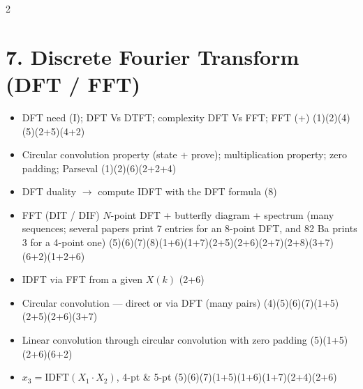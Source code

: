 \documentclass[10pt]{article}
\begin{document}
\begin{multicols}{2}
\section*{7. Discrete Fourier Transform (DFT / FFT)}
\begin{itemize}
  \item DFT need (I); DFT Vs DTFT; complexity DFT Vs FFT; FFT (+) \hfill (1)\allowbreak(2)\allowbreak(4)\allowbreak(5)\allowbreak(2+5)\allowbreak(4+2)
  \item Circular convolution property (state + prove); multiplication property; zero padding; Parseval \hfill (1)\allowbreak(2)\allowbreak(6)\allowbreak(2+2+4)
  \item DFT duality $\to$ compute IDFT with the DFT formula \hfill (8)
  \item FFT (DIT / DIF) $N$-point DFT + butterfly diagram + spectrum (many sequences; several papers print 7 entries for an 8-point DFT, and 82 Ba prints 3 for a 4-point one) \hfill (5)\allowbreak(6)\allowbreak(7)\allowbreak(8)\allowbreak(1+6)\allowbreak(1+7)\allowbreak(2+5)\allowbreak(2+6)\allowbreak(2+7)\allowbreak(2+8)\allowbreak(3+7)\allowbreak(6+2)\allowbreak(1+2+6)
  \item IDFT via FFT from a given $X(k)$ \hfill (2+6)
  \item Circular convolution --- direct or via DFT (many pairs) \hfill (4)\allowbreak(5)\allowbreak(6)\allowbreak(7)\allowbreak(1+5)\allowbreak(2+5)\allowbreak(2+6)\allowbreak(3+7)
  \item Linear convolution through circular convolution with zero padding \hfill (5)\allowbreak(1+5)\allowbreak(2+6)\allowbreak(6+2)
  \item $x_3=\mathrm{IDFT}(X_1{\cdot}X_2)$, 4-pt \& 5-pt \hfill (5)\allowbreak(6)\allowbreak(7)\allowbreak(1+5)\allowbreak(1+6)\allowbreak(1+7)\allowbreak(2+4)\allowbreak(2+6)
\end{itemize}


\end{multicols}
\end{document}
